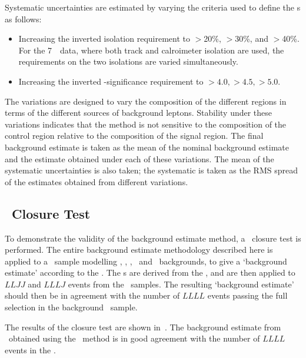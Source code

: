 Systematic uncertainties are estimated by varying the criteria used to define
the \lljet s as follows:
\begin{itemize}
\item Increasing the inverted isolation requirement to $>$20\%, $>$30\%, and
$>$40\%. For the 7~\tev\ data, where both track and calroimeter isolation are
used, the requirements on the two isolations are varied
simultaneously.
\item Increasing the inverted \dzero-significance requirement to
$>4.0,>4.5,>5.0$.
\end{itemize}
The variations are designed to vary the composition of the different regions in
terms of the different sources of background leptons. Stability under these
variations indicates that the method is not sensitive to the composition of the
control region relative to the composition of the signal region. The final
background estimate is taken as the mean of the nominal background estimate and
the estimate obtained under each of these variations. The mean of the systematic
uncertainties is also taken; the systematic is taken as the RMS spread of the
estimates obtained from different variations.

\subsection{\mc\ Closure Test}

To demonstrate the validity of the background estimate method, a \mc\ closure
test is performed. The entire background estimate methodology described here is
applied to a \mc\ sample modelling \Zjets, \ttbar,
\singletop, \WZ\ and \WW\ backgrounds, to give a `background estimate' according
to the \mc. The \ffactor s are derived from the \mc, and are then applied
to $LLJJ$ and $LLLJ$ events from the \mc\ samples. The resulting `background
estimate' should then be in agreement with the number of $LLLL$ events passing the full
selection in the background \mc\ sample.


The results of the closure test are shown in~. The
background estimate from \mc\ obtained using the \ffactor\ method is in good
agreement with the number of $LLLL$ events in the \mc.

